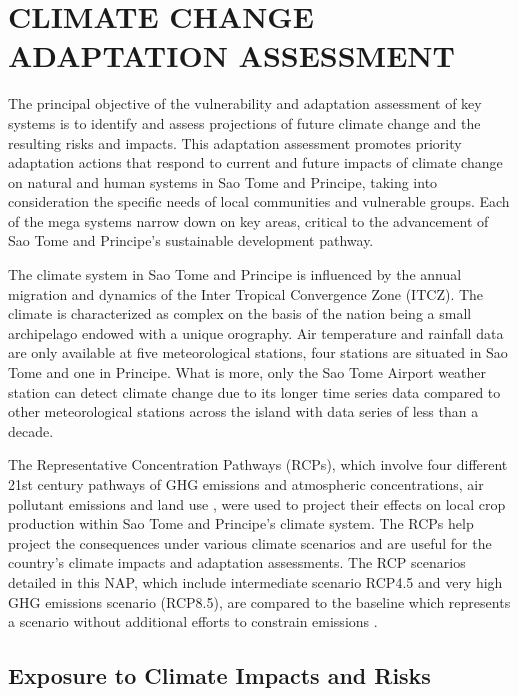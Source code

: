 \documentclass[
]{book}
\begin{document}
\hypertarget{climate-change-adaptation-assessment-1}{%
\chapter{CLIMATE CHANGE ADAPTATION ASSESSMENT}\label{climate-change-adaptation-assessment-1}}

The principal objective of the vulnerability and adaptation assessment of key systems is to identify and assess projections of future climate change and the resulting risks and impacts. This adaptation assessment promotes priority adaptation actions that respond to current and future impacts of climate change on natural and human systems in Sao Tome and Principe, taking into consideration the specific needs of local communities and vulnerable groups. Each of the mega systems narrow down on key areas, critical to the advancement of Sao Tome and Principe's sustainable development pathway.

The climate system in Sao Tome and Principe is influenced by the annual migration and dynamics of the Inter Tropical Convergence Zone (ITCZ). The climate is characterized as complex on the basis of the nation being a small archipelago endowed with a unique orography. Air temperature and rainfall data are only available at five meteorological stations, four stations are situated in Sao Tome and one in Principe. What is more, only the Sao Tome Airport weather station can detect climate change due to its longer time series data compared to other meteorological stations across the island with data series of less than a decade.

The Representative Concentration Pathways (RCPs), which involve four different 21st century pathways of GHG emissions and atmospheric concentrations, air pollutant emissions and land use , were used to project their effects on local crop production within Sao Tome and Principe's climate system. The RCPs help project the consequences under various climate scenarios and are useful for the country's climate impacts and adaptation assessments. The RCP scenarios detailed in this NAP, which include intermediate scenario RCP4.5 and very high GHG emissions scenario (RCP8.5), are compared to the baseline which represents a scenario without additional efforts to constrain emissions .

\hypertarget{exposure-to-climate-impacts-and-risks-10}{%
\section{Exposure to Climate Impacts and Risks}\label{exposure-to-climate-impacts-and-risks-10}}
\end{document}
